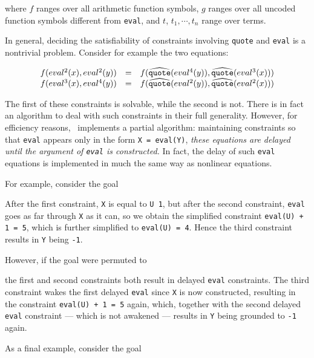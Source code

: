 \noindent
where $f$ ranges over all arithmetic function symbols, $g$ ranges over
all uncoded function symbols different from {\tt eval}, and $t$, $t_1,
\cdots , t_n$ range over terms.

In general, deciding the satisfiability of constraints
involving {\tt quote} and {\tt eval} is a nontrivial problem.
Consider for example the two equations: 

\[
\begin{array}{rcl}
f(eval^2(x), eval^2(y)) & = &
f(\mbox{$\widehat{\mbox{\tt quote}}$}(eval^4(y)), \mbox{$\widehat{\mbox{\tt quote}}$}(eval^3(x))) \\
f(eval^3(x), eval^4(y)) & = &
f(\mbox{$\widehat{\mbox{\tt quote}}$}(eval^2(y)), \mbox{$\widehat{\mbox{\tt quote}}$}(eval^2(x)))
\end{array}
\]

\noindent
The first of these constraints is solvable, while the second is not.
There is in fact an algorithm to deal with such constraints in
their full generality.  However, for efficiency reasons,
\CLPR\ implements a partial algorithm: maintaining constraints 
so that {\tt eval} appears only in the form {\tt X = eval(Y)},
{\em
these equations are delayed until the argument of {\tt eval} is constructed.
}
In fact, the delay of such {\tt eval} equations is implemented
in much the same way as nonlinear equations.

For example, consider the goal


\noindent
After the first constraint, {\tt X} is equal to {\tt U \unintt{+} 1}, 
but after the second constraint, {\tt eval} goes as far through {\tt X} 
as it can, so we obtain the simplified constraint {\tt eval(U) + 1 = 5},
which is further simplified to {\tt eval(U) = 4}.  Hence the third 
constraint results in {\tt Y} being {\tt -1}. 

However, if the goal were permuted to


\noindent
the first and second constraints both result in delayed {\tt eval} 
constraints. The third constraint wakes the first delayed 
{\tt eval} since {\tt X} is now 
constructed, resulting in the constraint {\tt eval(U) + 1 = 5} again, 
which, together with the second delayed {\tt eval} constraint --- which 
is not awakened --- results in {\tt Y} being grounded to {\tt -1} again.

As a final example, consider the goal

